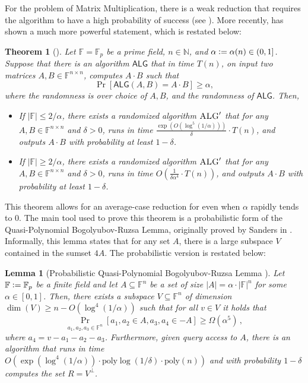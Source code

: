\documentclass[12pt]{caltech_thesis}
\newcommand{\defeq}{\vcentcolon=}
\def\F{\mathbb{F}}
\newtheorem{theorem}{Theorem}
\newtheorem{lemma}{Lemma}
\begin{document}
For the problem of Matrix Multiplication, there is a weak reduction that requires the algorithm to have a high probability of success (see ). More recently, \cite{asadi2022worstcase} has shown a much more powerful statement, which is restated below:
\begin{theorem}[\cite{asadi2022worstcase}]
\label{thm:asadi}
    Let $\F = \F_p$ be a prime field, $n \in \mathbb{N}$, and $\alpha \defeq \alpha(n) \in (0, 1]$. Suppose that there is an algorithm $\mathsf{ALG}$ that in time $T(n)$, on input two matrices $A, B \in \F^{n\times n}$, computes $A\cdot B$ such that
    \begin{equation*}
        \Pr[\mathsf{ALG}(A, B) = A\cdot B] \geq \alpha,
    \end{equation*}
    where the randomness is over choice of $A, B$, and the randomness of $\mathsf{ALG}$. Then, 
    \begin{itemize}
        \item If $|\F| \leq 2/\alpha$, there exists a randomized algorithm $\textsc{ALG}'$ that for any $A,B \in \F^{n\times n}$ and $\delta > 0$, runs in time $\frac{\exp(O(\log^5(1/\alpha)))}{\delta}\cdot T(n)$, and outputs $A\cdot B$ with probability at least $1 - \delta$.
        \item If $|\F| \geq 2/\alpha$, there exists a randomized algorithm $\textsc{ALG}'$ that for any $A,B \in \F^{n\times n}$ and $\delta > 0$, runs in time $O(\frac{1}{\delta \alpha^{4}}\cdot T(n))$, and outputs $A\cdot B$ with probability at least $1 - \delta$.
    \end{itemize}
\end{theorem}
This theorem allows for an average-case reduction for even when $\alpha$ rapidly tends to 0. The main tool used to prove this theorem is a probabilistic form of the Quasi-Polynomial Bogolyubov-Ruzsa Lemma, originally proved by Sanders in \cite{Sanders2012}. Informally, this lemma states that for any set $A$, there is a large subspace $V$ contained in the sumset $4A$. The probabilistic version is restated below:

\begin{lemma}[Probabilistic Quasi-Polynomial Bogolyubov-Ruzsa Lemma \citep{asadi2022worstcase}]
    \label{lem:qpbrasadi}
    Let $\F \defeq \F_p$ be a finite field and let $A \subseteq \F^n$ be a set of size $|A| = \alpha\cdot|\F|^n$ for some $\alpha \in [0,1]$.
    Then, there exists a subspace $V \subseteq \mathbb{F}^n$ of dimension $\dim(V) \geq n - O(\log^4(1/\alpha))$ such that for all $v \in V$ it holds that
    \begin{equation}
    \label{eq:qpbrassadi}
        \Pr_{a_1, a_2, a_3\in \mathbb{F}^n}[a_1, a_2 \in A, a_{3}, a_4 \in -A] \geq \Omega(\alpha^{5})\, ,
    \end{equation}
    where $a_4 = v - a_1 - a_2-a_3$. Furthermore, given query access to $A$, there is an algorithm that runs in time $O(\exp(\log^4(1/\alpha))\cdot\text{poly}\log(1/\delta)\cdot\text{poly}(n))$ and with probability $1-\delta$ computes the set $R = V^\perp$.
\end{lemma}
\end{document}
